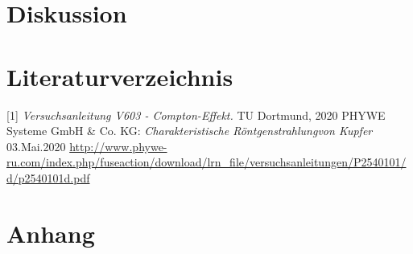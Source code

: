 \documentclass[titlepage = firstcover]{scrartcl}
\begin{document}
    \section{Diskussion}


    \newpage
    \section{Literaturverzeichnis}
            [1] \textit{Versuchsanleitung V603 - Compton-Effekt.} TU Dortmund, 2020 \newline
            [2] PHYWE Systeme GmbH \& Co. KG: \textit{Charakteristische Röntgenstrahlungvon Kupfer} 03.Mai.2020
                \url{http://www.phywe-ru.com/index.php/fuseaction/download/lrn_file/versuchsanleitungen/P2540101/d/p2540101d.pdf}

    \newpage
    \section{Anhang}
\end{document}
